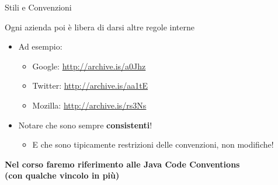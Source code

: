 \documentclass[xcolor=dvipsnames,presentation]{beamer}
\begin{document}
\begin{frame}[allowframebreaks]{Stili e Convenzioni}
\begin{block}{Ogni azienda poi è libera di darsi altre regole interne}

\begin{itemize}
\item Ad esempio:
\footnotesize
    \begin{itemize}
        \item Google: \url{http://archive.is/a0Jhz}
         \item Twitter: \url{http://archive.is/aa1tE}
         \item Mozilla: \url{http://archive.is/rs3Ns}
    \end{itemize}
    \normalsize
\item Notare che sono sempre \textbf{consistenti}!
\begin{itemize}
\item E che sono tipicamente restrizioni delle convenzioni, non modifiche!
\end{itemize}
\end{itemize}
\end{block}

\begin{center}
\textbf{Nel corso faremo riferimento alle Java Code Conventions\\(con qualche vincolo in più)}
\end{center}
\end{frame}
\end{document}
